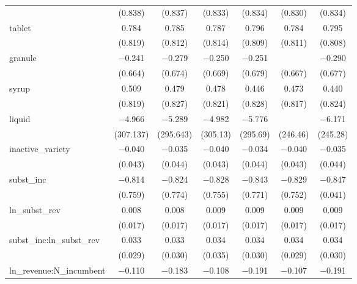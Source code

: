 \documentclass[a4j,10.5pt]{jarticle}
\begin{document}
\begin{table}[!htbp]
{\begin{tabular}{@{\extracolsep{5pt}}lcccccc}
          & (0.838) & (0.837) & (0.833) & (0.834) & (0.830) & (0.834) \\ 
         tablet & 0.784 & 0.785 & 0.787 & 0.796 & 0.784 & 0.795 \\ 
          & (0.819) & (0.812) & (0.814) & (0.809) & (0.811) & (0.808) \\ 
         granule & $-$0.241 & $-$0.279 & $-$0.250 & $-$0.251 &  & $-$0.290 \\ 
          & (0.664) & (0.674) & (0.669) & (0.679) & (0.667) & (0.677) \\ 
         syrup & 0.509 & 0.479 & 0.478 & 0.446 & 0.473 & 0.440 \\ 
          & (0.819) & (0.827) & (0.821) & (0.828) & (0.817) & (0.824) \\ 
         liquid & $-$4.966 & $-$5.289 & $-$4.982 & $-$5.776 &  & $-$6.171 \\ 
          & (307.137) & (295.643) & (305.13) & (295.69) & (246.46) & (245.28) \\ 
         inactive\_variety & $-$0.040 & $-$0.035 & $-$0.040 & $-$0.034 & $-$0.040 & $-$0.035 \\ 
          & (0.043) & (0.044) & (0.043) & (0.044) & (0.043) & (0.044) \\ 
         subst\_inc & $-$0.814 & $-$0.824 & $-$0.828 & $-$0.843 & $-$0.829 & $-$0.847 \\ 
          & (0.759) & (0.774) & (0.755) & (0.771) & (0.752) & (0.041) \\ 
         ln\_subst\_rev & 0.008 & 0.008 & 0.009 & 0.009 & 0.009 & 0.009 \\ 
          & (0.017) & (0.017) & (0.017) & (0.017) & (0.017) & (0.017) \\ 
         subst\_inc:ln\_subst\_rev & 0.033 & 0.033 & 0.034 & 0.034 & 0.034 & 0.034 \\ 
          & (0.029) & (0.030) & (0.035) & (0.030) & (0.029) & (0.030) \\ 
         ln\_revenue:N\_incumbent & $-$0.110 & $-$0.183 & $-$0.108 & $-$0.191 & $-$0.107 & $-$0.191 \\ 

\end{tabular}}
\end{table}
\end{document}
